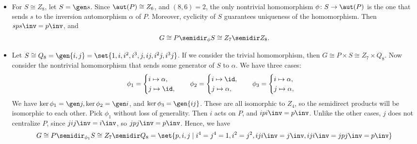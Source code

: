 \begin{solenum}
\begin{itemize}
        It is easy to see that $P \cap \gen a = 1$, so $\abs{P_0} = \abs{P}\abs{\gen a} = 28$.
        Moreover, $pPp\inv = P$, and $aPa\inv = P$ since $apa\inv = p\inv$ under the action of $\phi_1$ restricted to $\gen a$.
        Hence, $P_0 \cong Z_7 \semidir Z_4$.
        It is clear that $P_0$ is normal in $G$, and $\gen b$ centralizes $P_0$, so
        \[
        	G \cong P \semidir_{\phi_1} S \cong (Z_7 \semidir Z_4) \times Z_2.
        \]
        \item For $S \cong Z_8$, let $S = \gen s$.
        Since $\aut(P) \cong Z_6$, and $(8, 6) = 2$, the only nontrivial homomorphism $\phi \colon S \to \aut(P)$ is the one that sends $s$ to the inversion automorphism $\alpha$ of $P$.
        Moreover, cyclicity of $S$ guarantees uniqueness of the homomorphism.
        Then $sps\inv = p\inv$, and
        \[
        	G \cong P \semidir_\phi S \cong Z_7 \semidir Z_8.
        \]
        \item Let $S \cong Q_8 = \gen{i, j} = \set{1, i, i^2, i^3, j, ij, i^2j, i^3j}$.
        If we consider the trivial homomorphism, then $G \cong P \times S \cong Z_7 \times Q_8$.
        Now consider the nontrivial homomorphism that sends some generator of $S$ to $\alpha$.
        We have three cases:
        \[
        	\phi_1 = 
            \begin{cases}
                i \mapsto \alpha, \\
                j \mapsto \id,
            \end{cases} \quad
            \phi_2 = 
            \begin{cases}
                i \mapsto \id, \\
                j \mapsto \alpha,
            \end{cases} \quad
            \phi_3 =
            \begin{cases}
                i \mapsto \alpha, \\
                j \mapsto \alpha,
            \end{cases}
        \]
        We have $\ker\phi_1 = \gen j, \ker\phi_2 = \gen i$, and $\ker\phi_3 = \gen{ij}$.
        These are all isomorphic to $Z_4$, so the semidirect products will be isomorphic to each other.
        Pick $\phi_1$ without loss of generality.
        Then $i$ acts on $P$, and $ipi\inv = p\inv$.
        Unlike the other cases, $j$ does not centralize $P$, since $jij\inv = i\inv$, so $jpj\inv = p\inv$.
        Hence, we have
        \[
        	G \cong P \semidir_{\phi_1} S \cong Z_7 \semidir Q_8 = \set{p, i, j \mid i^4 = j^4 = 1, i^2 = j^2, iji\inv = j\inv, iji\inv = jpj\inv = p\inv}
\]
\end{itemize}
\end{solenum}
